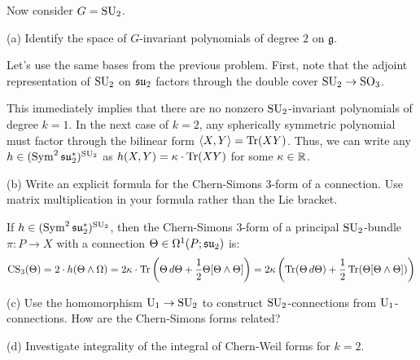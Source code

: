 \documentclass{../../templates/lkx_pset}
\begin{document}
\begin{problem}{3}
Now consider $G=\operatorname{SU}_2$.
\end{problem}
\begin{parts}
	\begin{part}{(a)}
		Identify the space of $G$-invariant polynomials of degree $2$ on $\mathfrak{g}$.
	\end{part}

	Let's use the same bases from the previous problem. First, note that the adjoint representation of $\operatorname{SU}_2$ on $\mathfrak{su}_2$ factors through the double cover $\operatorname{SU}_2 \to \operatorname{SO}_3$.  

	This immediately implies that there are no nonzero $\operatorname{SU}_2$-invariant polynomials of degree $k=1$. In the next case of $k=2$, any spherically symmetric polynomial must factor through the bilinear form $\langle X, Y\rangle = \operatorname{Tr}(XY)$. Thus, we can write any $h\in (\operatorname{Sym}^2\mathfrak{su}_2^*)^{\operatorname{SU}_2}$ as $h(X,Y) = \kappa\cdot \operatorname{Tr}(XY)$ for some $\kappa\in \mathbb{R}$.

	\begin{part}{(b)}
		Write an explicit formula for the Chern-Simons $3$-form of a connection. Use matrix multiplication in your formula rather than the Lie bracket.
	\end{part}

	If $h\in (\operatorname{Sym}^2\mathfrak{su}_2^*)^{\operatorname{SU}_2}$, then the Chern-Simons $3$-form of a principal $\operatorname{SU}_2$-bundle $\pi : P \to X$ with a connection $\Theta\in \Omega^1(P; \mathfrak{su}_2)$ is:
	\[
    \textrm{CS}_3(\Theta) = 2\cdot h(\Theta\wedge \Omega) = 2\kappa\cdot \operatorname{Tr}\left(\Theta\, d\Theta + \frac{1}{2}\Theta[\Theta\wedge\Theta]\right) = 2\kappa\left(\operatorname{Tr}(\Theta\, d\Theta) + \frac{1}{2}\operatorname{Tr}(\Theta[\Theta\wedge\Theta])\right)
	\]

	\begin{part}{(c)}
		Use the homomorphism $\operatorname{U}_1 \to \operatorname{SU}_2$ to construct $\operatorname{SU}_2$-connections from $\operatorname{U}_1$-connections. How are the Chern-Simons forms related?
	\end{part}

	\begin{part}{(d)}
		Investigate integrality of the integral of Chern-Weil forms for $k=2$.
	\end{part}
\end{parts}
\end{document}
